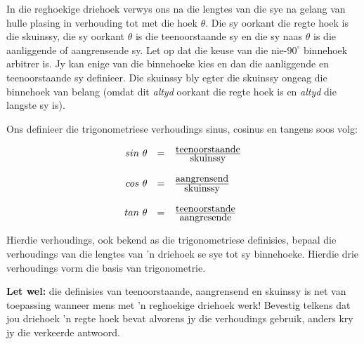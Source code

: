 

In die reghoekige driehoek verwys ons na die lengtes van die sye na gelang van hulle plasing in verhouding tot met die hoek $\theta $. Die sy oorkant die regte hoek is die skuinssy, die sy oorkant $\theta $ is die teenoorstaande sy en die sy naas $\theta $ is die aanliggende of aangrensende sy.
Let op dat die keuse van die nie-$90^{\circ}$ binnehoek arbitrer is. Jy kan enige van die binnehoeke kies en dan die aanliggende en teenoorstaande sy definieer. Die skuinssy bly egter die skuinssy ongeag die binnehoek van belang (omdat dit \textit{altyd} oorkant die regte hoek is en \textit{altyd} die langste sy is).

Ons definieer die trigonometriese verhoudings sinus, cosinus en tangens soos volg:


\begin{equation*}
\begin{array}{ccc}\hfill sin~\theta & =& \frac{\mbox{teenoorstaande}}{\mbox{skuinssy}}\hfill \\
\\
 \hfill cos~\theta & =& \frac{\mbox{aangrensend}}{\mbox{skuinssy}}\hfill \\
\\
 \hfill tan~\theta & =& \frac{\mbox{teenoorstande}}{\mbox{aangresende}}\hfill 
\end{array}
\end{equation*}

Hierdie verhoudings, ook bekend as die trigonometriese definisies, bepaal die verhoudings van die lengtes van 'n driehoek se sye tot sy binnehoeke. 
Hierdie drie verhoudings vorm die basis van trigonometrie. \par

\textbf{Let wel: }die definisies van teenoorstaande, aangrensend en skuinssy is net van toepassing wanneer mens met 'n reghoekige driehoek werk! Bevestig telkens dat jou driehoek 'n regte hoek bevat alvorens jy die verhoudings gebruik, anders kry jy die verkeerde antwoord.



